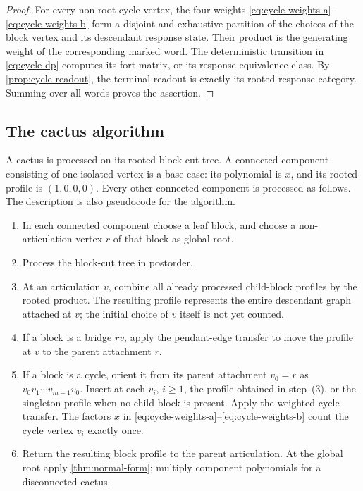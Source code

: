\documentclass[11pt,reqno]{amsart}
\theoremstyle{definition}
\begin{document}
\begin{proof}
For every non-root cycle vertex, the four weights
\eqref{eq:cycle-weights-a}--\eqref{eq:cycle-weights-b} form a disjoint and
exhaustive partition of the choices of the block vertex and its descendant
response state.  Their product is the generating weight of the corresponding
marked word.  The deterministic transition in \eqref{eq:cycle-dp} computes its
fort matrix, or its response-equivalence class.  By
\cref{prop:cycle-readout}, the terminal readout is exactly its rooted response
category.  Summing over all words proves the assertion.
\end{proof}

\subsection{The cactus algorithm}

A cactus is processed on its rooted block-cut tree.  A connected component
consisting of one isolated vertex is a base case: its polynomial is $x$, and
its rooted profile is $(1,0,0,0)$.  Every other connected component is
processed as follows.  The description is also pseudocode for the algorithm.
\begin{enumerate}[label=\textnormal{(\arabic*)}]
\item In each connected component choose a leaf block, and choose a
non-articulation vertex $r$ of that block as global root.
\item Process the block-cut tree in postorder.
\item At an articulation $v$, combine all already processed child-block
profiles by the rooted product.  The resulting profile represents the entire
descendant graph attached at $v$; the initial choice of $v$ itself is not yet
counted.
\item If a block is a bridge $rv$, apply the pendant-edge transfer to move the
profile at $v$ to the parent attachment $r$.
\item If a block is a cycle, orient it from its parent attachment
$v_0=r$ as $v_0v_1\cdots v_{m-1}v_0$.  Insert at each $v_i$, $i\ge1$, the
profile obtained in step~(3), or the singleton profile when no child block is
present.  Apply the weighted cycle transfer.  The factors $x$ in
\eqref{eq:cycle-weights-a}--\eqref{eq:cycle-weights-b} count the cycle vertex
$v_i$ exactly once.
\item Return the resulting block profile to the parent articulation.  At the
global root apply \cref{thm:normal-form}; multiply component polynomials for a
disconnected cactus.
\end{enumerate}
\end{document}
